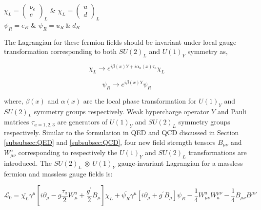 \begin{center}
$ \chi_{L} = \begin{pmatrix} \nu_{e} \\ e\end{pmatrix}_{L}$ \hspace{5pt} $\&$ \hspace{5pt} $ \chi_{L} = \begin{pmatrix}  u \\ d \end{pmatrix}_{L}$ \\
\vspace{10pt}
$ \psi_{R} = e_{R}$ \hspace{10pt} $\&$ \hspace{5pt} $\psi_{R} = u_{R} ~\&~ d_{R}$
\end{center}
The Lagrangian for these fermion fields should be invariant under local gauge transformation corresponding to both $SU(2)_{L}$ and $U(1)_{Y}$ symmetry as, 

\begin{equation}
\chi_{L} \rightarrow e^{i\beta(x)Y+i\alpha_{a}(x)\tau_{a}} \chi_{L}
\label{eqn:SU2LHTransform}
\end{equation}

\begin{equation}
\psi_{R} \rightarrow e^{i\beta(x)Y} \psi_{R}
\label{eqn:SU2RHTransform}
\end{equation}

where, $\beta(x)$ and $\alpha(x)$ are the local phase transformation for $U(1)_{Y}$ and $SU(2)_{L}$ symmetry groups respectively. Weak hypercharge operator $Y$ and Pauli matrices $\tau_{a=1,2,3}$ are generators of $U(1)_{Y}$ and $SU(2)_{L}$ symmetry groups respectively. Similar to the formulation in QED and QCD discussed in Section \ref{subsubsec:QED} and \ref{subsubsec:QCD}, four new field strength tensors $B_{\mu\nu}$ and $W^{a}_{\mu\nu}$ corresponding to respectively the $U(1)_{Y}$ and $SU(2)_{L}$ transformations are introduced. The  $SU(2)_{L}~\otimes~U(1)_{Y}$ gauge-invariant Lagrangian for a massless fermion and massless gauge fields is:

\begin{equation}
\mathcal{L}_{0} = \bar{\chi_{L}}\gamma^{\mu} [i\partial_{\mu} - g \frac{\tau_{a}}{2} W^a_{\mu} + \frac{g^{'}}{2} B_{\mu} ] \chi_{L} + \bar{\psi_{R}} \gamma^{\mu} [ i \partial_{\mu} + g^{'} B_{\mu} ] \psi_{R} - \frac{1}{4} W_{\mu\nu}^{a} W^{\mu\nu}_{a} - \frac{1}{4} B_{\mu\nu} B^{\mu\nu}
\label{eqn:EWKLagrangian1}
\end{equation}

